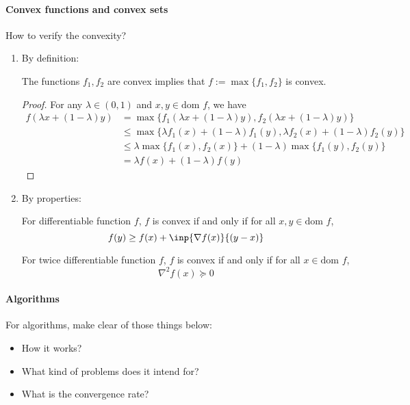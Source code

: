 \paragraph{Convex functions and convex sets}
How to verify the convexity?
\begin{enumerate}
\item
By definition:
\begin{proposition}
The functions $f_1,f_2$ are convex implies that $f:=\max\{f_1,f_2\}$ is convex.
\end{proposition}
\begin{proof}
For any $\lambda\in(0,1)$ and $x,y\in\mbox{dom }f$, we have
\begin{align*}
f(\lambda x+(1-\lambda)y)&=\max\{f_1(\lambda x+(1-\lambda)y),f_2(\lambda x+(1-\lambda)y)\}\\
&\le\max\{\lambda f_1(x)+(1-\lambda)f_1(y),\lambda f_2(x)+(1-\lambda)f_2(y)\}\\
&\le\lambda\max\{f_1(x),f_2(x)\}+(1-\lambda)\max\{f_1(y),f_2(y)\}\\
&=\lambda f(x)+(1-\lambda)f(y)
\end{align*}
\end{proof}
\item
By properties:
\begin{proposition}
For differentiable function $f$, $f$ is convex if and only if for all $x,y\in\mbox{dom }f$,
\[
f(y)\ge f(x)+\inp{\nabla f(x)}{(y-x)}
\]
\end{proposition}
\begin{proposition}
For twice differentiable function $f$, $f$ is convex if and only if for all $x\in\mbox{dom }f$,
\[
\nabla^2f(x)\succeq0
\]
\end{proposition}
\end{enumerate}
\paragraph{Algorithms}
For algorithms, make clear of those things below:
\begin{itemize}
\item
How it works?
\item
What kind of problems does it intend for?
\item
What is the convergence rate?
\end{itemize}
